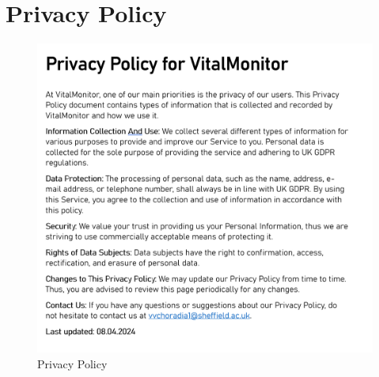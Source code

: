 \chapter{Privacy Policy}
\label{app:privacy-policy}
\begin{figure}[h!]
    \centering
    \includegraphics[width=0.95\linewidth]{images/pp.png}
    \caption{Privacy Policy}
    \label{fig:pp}
\end{figure}